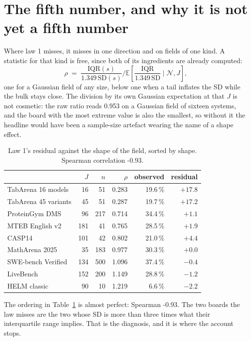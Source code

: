 \documentclass[10pt]{article}
\begin{document}
\section{The fifth number, and why it is not yet a fifth number}
\label{sec:shape}

Where law 1 misses, it misses in one direction and on fields of one kind.
A statistic for that kind is free, since both of its ingredients are
already computed:
\begin{equation}
\rho \;=\; \frac{\mathrm{IQR}(s)}{1.349\,\mathrm{SD}(s)} \Big/ \mathbb{E}\!\left[\frac{\mathrm{IQR}}{1.349\,\mathrm{SD}}\;\Big|\;\mathcal{N}, J\right],
\end{equation}
one for a Gaussian field of any size, below one when a tail inflates the SD
while the bulk stays close. The division by its own Gaussian expectation at
that $J$ is not cosmetic: the raw ratio reads 0.953 on a Gaussian field of
sixteen systems, and the board with the most extreme value is also the
smallest, so without it the headline would have been a sample-size artefact
wearing the name of a shape effect.

\begin{table}[t]\centering\small
\begin{tabular}{l rr r rr}
\toprule
 & $J$ & $n$ & $\rho$ & observed & residual \\
\midrule
TabArena 16 models & 16 & 51 & 0.283 & 19.6\,\% & $+17.8$ \\
TabArena 45 variants & 45 & 51 & 0.287 & 19.7\,\% & $+17.2$ \\
ProteinGym DMS & 96 & 217 & 0.714 & 34.4\,\% & $+1.1$ \\
MTEB English v2 & 181 & 41 & 0.765 & 28.5\,\% & $+1.9$ \\
CASP14 & 101 & 42 & 0.802 & 21.0\,\% & $+4.4$ \\
MathArena 2025 & 35 & 183 & 0.977 & 30.3\,\% & $+0.0$ \\
SWE-bench Verified & 134 & 500 & 1.096 & 37.4\,\% & $-0.4$ \\
LiveBench & 152 & 200 & 1.149 & 28.8\,\% & $-1.2$ \\
HELM classic & 90 & 10 & 1.219 & 6.6\,\% & $-2.2$ \\
\bottomrule
\end{tabular}
\caption{Law 1's residual against the shape of the field, sorted by shape. Spearman correlation -0.93.}
\label{tab:shape}
\end{table}

The ordering in Table~\ref{tab:shape} is almost perfect: Spearman -0.93.
The two boards the law misses are the two whose SD is more than three times
what their interquartile range implies. That is the diagnosis, and it is
where the account stops.
\end{document}
